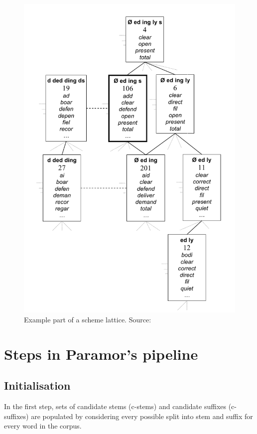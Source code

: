 \begin{figure}[p]
\centering
\includegraphics[scale=0.6]{schemeLattice.png}
\caption{Example part of a scheme lattice. Source: \citep{monson09}}
\label{fig:scheme_lattice}
\end{figure}

\section{Steps in Paramor's pipeline}

\subsection{Initialisation}\label{sec:paramor_init}
In the first step, sets of candidate stems (c-stems) and candidate suffixes (c-suffixes) are populated by considering every possible split into stem and suffix for every word in the corpus.

